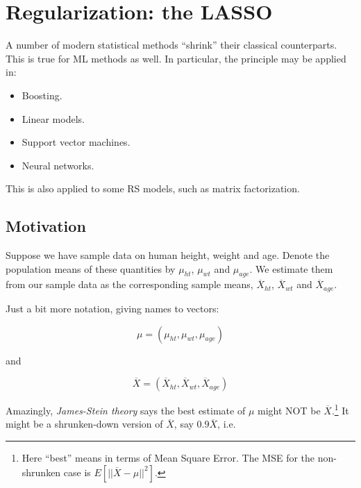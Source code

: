 \section{Regularization: the LASSO}

A number of modern statistical methods ``shrink'' their classical
counterparts.  This is true for ML methods as well.  In particular, the
principle may be applied in:

\begin{itemize}

\item Boosting.

\item Linear models.

\item Support vector machines.

\item Neural networks.

\end{itemize}

This is also applied to some RS models, such as matrix factorization.

\subsection{Motivation}

Suppose we have sample data on human height, weight and age.  Denote the
population means of these quantities by $\mu_{ht}$, $\mu_{wt}$ and
$\mu_{age}$.  We estimate them from our sample data as the corresponding
sample means, $\overline{X}_{ht}$, $\overline{X}_{wt}$ and
$\overline{X}_{age}$.

Just a bit more notation, giving names to vectors:

\begin{equation}
\mu = (\mu_{ht},\mu_{wt}, \mu_{age})
\end{equation}

\noindent
and

\begin{equation}
\overline{X} = (\overline{X}_{ht},\overline{X}_{wt}, \overline{X}_{age})
\end{equation}

\noindent
Amazingly, \textit{James-Stein theory} says
the best estimate of $\mu$ might NOT be $\overline{X}$.\footnote{Here
``best'' means in terms of Mean Square Error.  The MSE for the
non-shrunken case is $E \left [||\overline{X} - \mu ||^2 \right ].$}  
It might be a shrunken-down version of $\overline{X}$, say $0.9
\overline{X}$, i.e.

